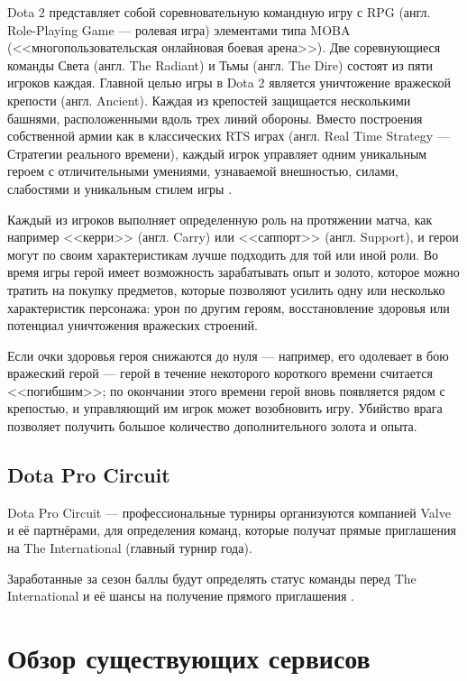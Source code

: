 Dota 2 представляет собой соревновательную командную игру с RPG (англ. Role-Playing Game --- ролевая игра) элементами типа MOBA (<<многопользовательская онлайновая боевая арена>>). Две соревнующиеся команды Света (англ. The Radiant) и Тьмы (англ. The Dire) состоят из пяти игроков каждая. Главной целью игры в Dota 2 является уничтожение вражеской крепости (англ. Ancient). Каждая из крепостей защищается несколькими башнями, расположенными вдоль трех линий обороны. Вместо построения собственной армии как в классических RTS играх (англ. Real Time Strategy --- Стратегии реального времени), каждый игрок управляет одним уникальным героем с отличительными умениями, узнаваемой внешностью, силами, слабостями и уникальным стилем игры \cite{dota2}.


Каждый из игроков выполняет определенную роль на протяжении матча,  как например <<керри>> (англ. Carry) или <<саппорт>> (англ. Support), и герои могут по своим характеристикам лучше подходить для той или иной роли. Во время игры герой имеет возможность зарабатывать опыт и золото, которое можно тратить на покупку предметов, которые позволяют усилить одну или несколько характеристик персонажа: урон по другим героям, восстановление здоровья или потенциал уничтожения вражеских строений. 

Если очки здоровья героя снижаются до нуля — например, его одолевает в бою вражеский герой --- герой в течение некоторого короткого времени считается <<погибшим>>; по окончании этого времени герой вновь появляется рядом с крепостью, и управляющий им игрок может возобновить игру. Убийство врага позволяет получить большое количество дополнительного золота и опыта.

\subsection{Dota Pro Circuit}

Dota Pro Circuit --- профессиональные турниры организуются компанией Valve и её партнёрами, для определения команд, которые получат прямые приглашения на The International (главный турнир года).

Заработанные за сезон баллы будут определять статус команды перед The International и её шансы на получение прямого приглашения \cite{dpc}.

\section{Обзор существующих сервисов}

